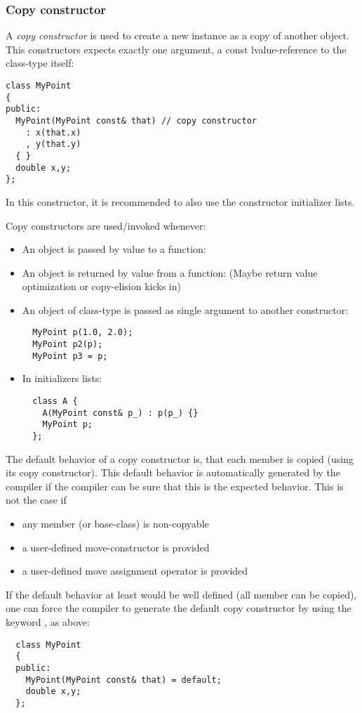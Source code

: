 \subsubsection{Copy constructor}
A \emph{copy constructor} is used to create a new instance as a copy of another object. This constructors expects exactly one argument, a const lvalue-reference
to the class-type itself:
%
\begin{verbatim}
class MyPoint
{
public:
  MyPoint(MyPoint const& that) // copy constructor
    : x(that.x)
    , y(that.y)
  { }
  double x,y;
};
\end{verbatim}
%
In this constructor, it is recommended to also use the constructor initializer lists.

Copy constructors are used/invoked whenever:
\begin{itemize}
  \item An object is passed by value to a function:
  \item An object is returned by value from a function:
    (Maybe return value optimization or copy-elision kicks in)
  \item An object of class-type is passed as single argument to another constructor:
    \begin{verbatim}
  MyPoint p(1.0, 2.0);
  MyPoint p2(p);
  MyPoint p3 = p;
    \end{verbatim}
  \item In initializers lists:
    \begin{verbatim}
  class A {
    A(MyPoint const& p_) : p(p_) {}
    MyPoint p;
  };
    \end{verbatim}
\end{itemize}

The default behavior of a copy constructor is, that each member is copied (using its copy constructor). This default behavior is automatically generated
by the compiler if the compiler can be sure that this is the expected behavior. This is not the case if
\begin{itemize}
  \item any member (or base-class) is non-copyable
  \item a user-defined move-constructor is provided
  \item a user-defined move assignment operator is provided
\end{itemize}

If the default behavior at least would be well defined (\ie all member can be copied), one can force the compiler to generate the default copy constructor
by using the keyword , as above:
%
\begin{verbatim}
  class MyPoint
  {
  public:
    MyPoint(MyPoint const& that) = default;
    double x,y;
  };
\end{verbatim}

